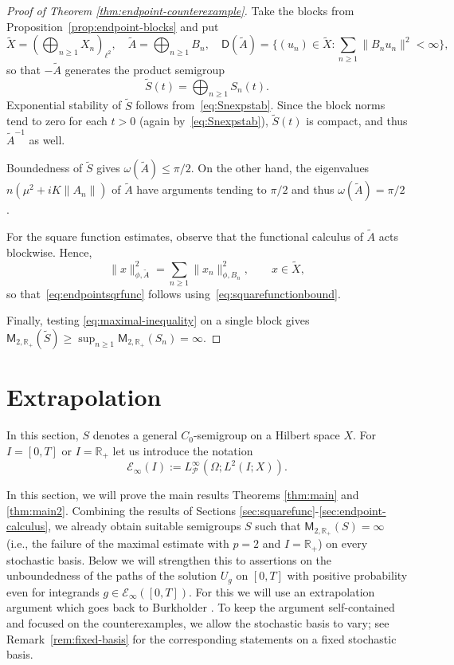\documentclass[11pt]{amsart}
\theoremstyle{definition}
\theoremstyle{remark}
\numberwithin{equation}{section}
\newcommand{\cP}{\mathcal P}
\newcommand{\R}{\mathbb R}
\newcommand{\1}{\mathbf 1}
\newcommand{\cM}{\mathsf{M}}
\newcommand{\cD}{\mathsf D}
\newcommand{\norm}[1]{\lVert #1\rVert}
\begin{document}
\begin{proof}[Proof of Theorem \ref{thm:endpoint-counterexample}]
Take the blocks from Proposition~\ref{prop:endpoint-blocks} and put
\[
 \widetilde{X}=\left(\bigoplus_{n\ge1}X_n\right)_{\ell^2},\quad
 \widetilde{A} =\bigoplus_{n\ge1} B_n, \quad 
 \cD(\widetilde{A})=\Big\{(u_n)\in \widetilde{X}:
                  \sum_{n\ge1}\norm{ B_nu_n}^2<\infty\Big\},
\]
so that $-\widetilde{A}$ generates the product semigroup
\[
 \widetilde{S}(t)=\bigoplus_{n\ge1}S_n(t).
\]
Exponential stability of $\widetilde{S}$ follows from~\eqref{eq:Snexpstab}.
Since the block norms tend to zero
for each $t>0$ (again by~\eqref{eq:Snexpstab}), $\widetilde{S}(t)$ is compact, and thus $\widetilde{A}^{-1}$ as well.  

Boundedness of $\widetilde{S}$ gives $\omega(\widetilde{A})\le\pi/2$. 
On the other hand,
the eigenvalues $n(\mu^2+i K \norm{A_n})$ of $\widetilde{A}$ have arguments tending to $\pi/2$ and thus $\omega(\widetilde{A})=\pi/2$.

For the square function estimates, observe that the functional calculus of $\widetilde{A}$ acts blockwise. Hence,
\[
 \norm{x}_{\phi,\widetilde{A}}^2 
 =\sum_{n\ge1}\norm{x_n}_{\phi,B_n}^2, \qquad x \in \widetilde{X},
\]
so that~\eqref{eq:endpointsqrfunc} follows using~\eqref{eq:squarefunctionbound}. 

Finally, testing \eqref{eq:maximal-inequality} on a single block gives $\cM_{2,\R_+}(\widetilde{S}) \ge\sup_{n\ge1}\cM_{2,\R_+}(S_n)
 =\infty$.
\end{proof}


\section{Extrapolation}
\label{sec:extrapolation}
In this section, $S$ denotes a general $C_0$-semigroup on a Hilbert space $X$.  For $I = [0,T]$ or $I = \R_+$ let us introduce the notation
\begin{equation}
    \mathcal E_\infty(I)
 :=L^\infty_{\cP}(\Omega;L^2(I;X)).
\end{equation}

In this section, we will prove the main results Theorems \ref{thm:main} and \ref{thm:main2}. Combining the results of Sections \ref{sec:squarefunc}-\ref{sec:endpoint-calculus}, we already obtain suitable semigroups $S$ such that $\cM_{2,\R_+}(S) = \infty$ (i.e., the failure of the maximal estimate with $p = 2$ and $I = \R_+$) on every stochastic basis. 
Below we will strengthen this to assertions on the unboundedness of the paths of the solution $U_g$ on $[0,T]$ with positive probability even for integrands $g \in \mathcal{E}_{\infty}([0,T])$. For this we will use an extrapolation argument which goes back to Burkholder \cite{Burkholder1973}. To keep the argument self-contained and focused on the counterexamples, we allow the stochastic basis to vary; see Remark~\ref{rem:fixed-basis} for the corresponding statements on a fixed stochastic basis.
\end{document}
